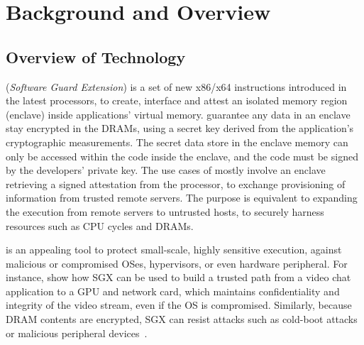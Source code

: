 \section{Background and Overview}
\label{sec:gsgx:background}

\subsection{Overview of \intel{} \sgx{} Technology}
\label{sec:gsgx:background:sgx}


\intel{} \sgx{} ({\it Software Guard Extension})
is a set of new x86/x64 instructions
introduced in the latest \intel{} \skylake{} processors,
to create, interface and attest
an isolated memory region (enclave) inside applications' virtual memory.
\sgx{} guarantee any data in an enclave
stay encrypted in the DRAMs, using a secret key derived from
the application's cryptographic measurements.
The secret data store in the enclave memory
can only be accessed within the code inside the enclave,
and the code must be signed by the developers' private key.
The use cases of \sgx{} mostly involve an enclave
retrieving a signed attestation from the \intel{} processor,
to exchange provisioning of information from trusted remote servers.
The purpose is equivalent to
expanding the execution from remote servers
to untrusted hosts,
to securely harness resources such as CPU cycles and DRAMs.

\sgx{} is an appealing tool to protect small-scale, highly sensitive execution, 
against malicious or compromised OSes, hypervisors, or even hardware peripheral.
For instance, \cite{hoekstra13sgx} show how SGX can be used
to build a trusted path from a video chat application to a GPU and network card, which maintains confidentiality and integrity of the
video stream, even if the OS is compromised.
Similarly, because DRAM contents are encrypted, SGX can resist attacks such as cold-boot attacks~\citep{halderman09coldboot} or 
malicious peripheral devices~\citep{hudson15thunderstrike}.

